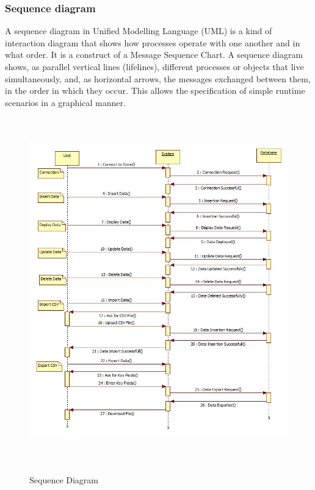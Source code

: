 \subsubsection{Sequence diagram}
\hspace*{0.7in} A sequence diagram in Unified Modelling Language (UML) is a kind of interaction diagram that shows how processes operate with one another and in what order. It is a construct of a Message Sequence Chart. A sequence diagram shows, as parallel vertical lines (lifelines), different processes or objects that live simultaneously, and, as horizontal arrows, the messages exchanged between them, in the order in which they occur. This allows the specification of simple runtime scenarios in a graphical manner.
\begin{figure}[h]
\centering
  \includegraphics[width=15cm,height=15cm]{Fig13.jpg}\\
  \caption{Sequence Diagram}
  \label{Sequence Diagram}
\end{figure}

